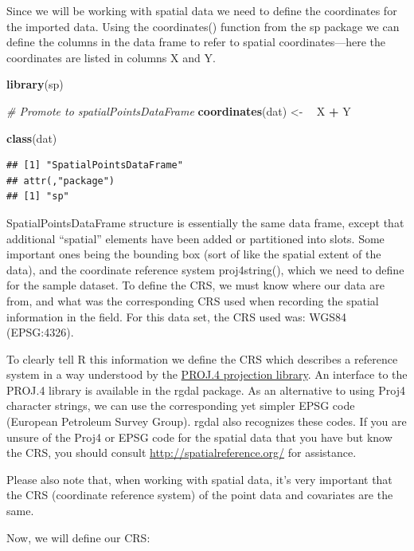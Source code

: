 \documentclass[10pt,b5paper,]{book}
\newenvironment{Shaded}{\begin{snugshade}}{\end{snugshade}}
\newcommand{\CommentTok}[1]{\textcolor[rgb]{0.56,0.35,0.01}{\textit{#1}}}
\newcommand{\ErrorTok}[1]{\textcolor[rgb]{0.64,0.00,0.00}{\textbf{#1}}}
\newcommand{\KeywordTok}[1]{\textcolor[rgb]{0.13,0.29,0.53}{\textbf{#1}}}
\newcommand{\NormalTok}[1]{#1}
\newcommand{\OperatorTok}[1]{\textcolor[rgb]{0.81,0.36,0.00}{\textbf{#1}}}
\newcommand{\StringTok}[1]{\textcolor[rgb]{0.31,0.60,0.02}{#1}}
\theoremstyle{definition}
\theoremstyle{definition}
\theoremstyle{definition}
\theoremstyle{remark}
\begin{document}
Since we will be working with spatial data we need to define the
coordinates for the imported data. Using the coordinates() function from
the sp package we can define the columns in the data frame to refer to
spatial coordinates---here the coordinates are listed in columns X and
Y.

\begin{Shaded}
\begin{Highlighting}[]
\KeywordTok{library}\NormalTok{(sp)}

\CommentTok{# Promote to spatialPointsDataFrame}
\KeywordTok{coordinates}\NormalTok{(dat) <-}\StringTok{ }\ErrorTok{~}\StringTok{ }\NormalTok{X }\OperatorTok{+}\StringTok{ }\NormalTok{Y}

\KeywordTok{class}\NormalTok{(dat)}
\end{Highlighting}
\end{Shaded}

\begin{verbatim}
## [1] "SpatialPointsDataFrame"
## attr(,"package")
## [1] "sp"
\end{verbatim}

SpatialPointsDataFrame structure is essentially the same data frame,
except that additional ``spatial'' elements have been added or
partitioned into slots. Some important ones being the bounding box (sort
of like the spatial extent of the data), and the coordinate reference
system proj4string(), which we need to define for the sample dataset. To
define the CRS, we must know where our data are from, and what was the
corresponding CRS used when recording the spatial information in the
field. For this data set, the CRS used was: WGS84 (EPSG:4326).

To clearly tell R this information we define the CRS which describes a
reference system in a way understood by the
\href{http://trac.osgeo.org/proj/}{PROJ.4 projection library}. An
interface to the PROJ.4 library is available in the rgdal package. As an
alternative to using Proj4 character strings, we can use the
corresponding yet simpler EPSG code (European Petroleum Survey Group).
rgdal also recognizes these codes. If you are unsure of the Proj4 or
EPSG code for the spatial data that you have but know the CRS, you
should consult \url{http://spatialreference.org/} for assistance.

Please also note that, when working with spatial data, it's very
important that the CRS (coordinate reference system) of the point data
and covariates are the same.

Now, we will define our CRS:
\end{document}
